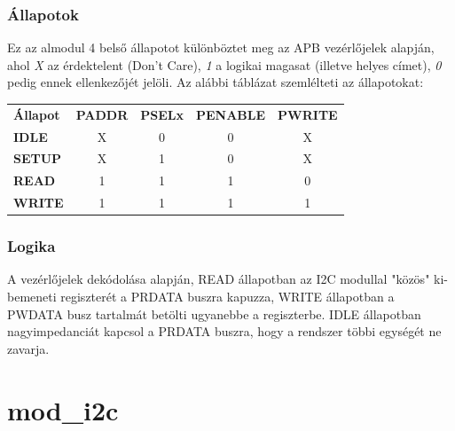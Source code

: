 \subsubsection{Állapotok}
    Ez az almodul 4 belső állapotot különböztet meg az APB vezérlőjelek alapján, ahol \emph{X} az érdektelent (Don't Care), \emph{1}  a logikai magasat (illetve helyes címet), \emph{0}  pedig ennek ellenkezőjét jelöli. Az alábbi táblázat szemlélteti az állapotokat:\\[2ex]

    \begin{tabular}{l|c|c|c|c}
        \textbf{Állapot}& \textbf{PADDR} & \textbf{PSELx} & \textbf{PENABLE}   & \textbf{PWRITE}    \\
        \textbf{IDLE}   &   X            & 0              & 0                  & X                  \\
        \textbf{SETUP}  &   X            & 1              & 0                  & X                  \\
        \textbf{READ}   &   1            & 1              & 1                  & 0                  \\
        \textbf{WRITE}  &   1            & 1              & 1                  & 1
    \end{tabular}

\subsubsection{Logika}
    A vezérlőjelek dekódolása alapján, READ állapotban az I2C modullal "közös" ki-bemeneti regiszterét a PRDATA buszra kapuzza, WRITE állapotban a PWDATA busz tartalmát betölti ugyanebbe a regiszterbe. IDLE állapotban nagyimpedanciát kapcsol a PRDATA buszra, hogy a rendszer többi egységét ne zavarja.


\section{mod\_i2c}
